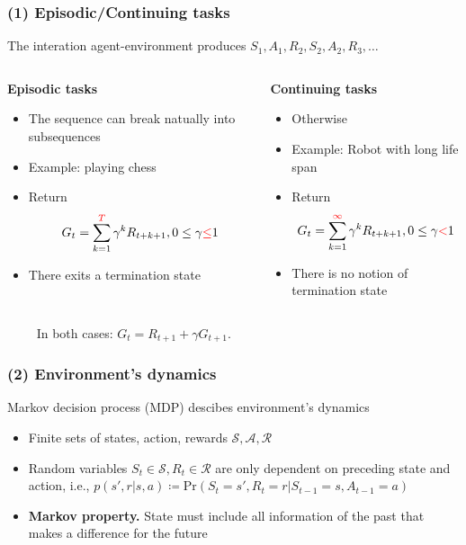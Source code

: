 \documentclass[10pt]{beamer}
\theoremstyle{remark}
\begin{document}
\begin{frame}
    \frametitle{(1) Episodic/Continuing tasks}
    The interation agent-environment produces $S_1, A_1, R_2, S_2, A_2, R_3, \ldots $
    \begin{columns}
        \begin{column}{0.5 \textwidth}
            \textbf{Episodic tasks}
            \begin{itemize}
                \item The sequence can break natually into subsequences
                \item Example: playing chess
                \item Return 
                    \[G_t = \sum^{{\color{red}T}}_{k=1} \gamma^{k} R_{t+k+1}, 0 \leq \gamma {\color{red}\leq} 1 \]
                \item There exits a termination state
            \end{itemize}
        \end{column}

        \begin{column}{0.5\textwidth}
            \textbf{Continuing tasks}
            \begin{itemize}
                \item Otherwise
                \item Example: Robot with long life span
                \item Return 
                    \[G_t = \sum^{{\color{red}\infty}}_{k=1} \gamma^{k} R_{t+k+1}, 0 \leq \gamma {\color{red}<} 1\]
                \item There is no notion of termination state
            \end{itemize}
        \end{column}
    \end{columns}

    $\quad \quad $ In both cases: $G_t = R_{t+1} + \gamma G_{t+1}$.
\end{frame}

\begin{frame}
    \frametitle{(2) Environment's dynamics}
    Markov decision process (MDP) descibes environment's dynamics
   \begin{itemize}
       \item Finite sets of states, action, rewards $\mathcal{S}, \mathcal{A}, \mathcal{R}$
       \item Random variables $S_t \in \mathcal{S}, R_t \in \mathcal{R}$ are only dependent on preceding state and action, i.e.,
           $ p(s', r | s, a) \coloneqq \text{Pr}(S_t = s', R_t = r | S_{t-1} = s, A_{t-1} = a)$ 
       \item \textbf{Markov property.} State must include all information of the past that makes a difference for the future
   \end{itemize}
\end{frame}
\end{document}
